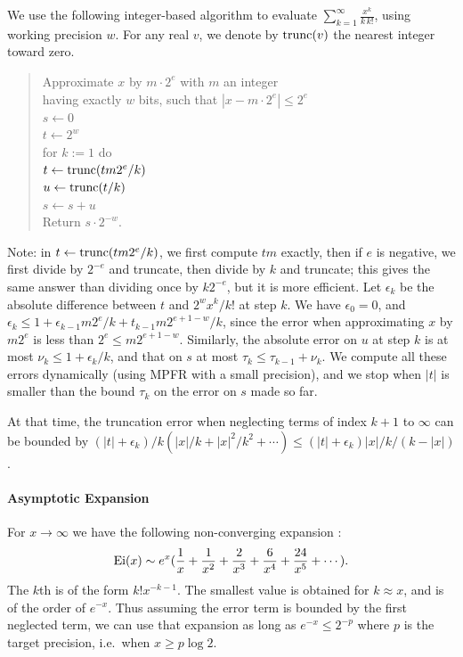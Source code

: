 \documentclass[12pt]{amsart}
\def\q{\hspace*{5mm}}
\begin{document}
We use the following integer-based algorithm to evaluate
$\sum_{k=1}^{\infty} \frac{x^k}{k \, k!}$, using working precision $w$.
For any real $v$, we denote by ${\rm trunc}(v)$ the nearest integer
toward zero.
\begin{quote}
Approximate $x$ by  $m\cdot2^e$ with $m$ an integer \\
having exactly $w$ bits, such that $|x - m\cdot2^e| \leq 2^e$ \\
$s \leftarrow 0$ \\ %
$t \leftarrow 2^w$ \\ %
for $k := 1$ do \\
\q $t \leftarrow {\rm trunc}(t m 2^e/k)$ \\
\q $u \leftarrow {\rm trunc}(t/k)$ \\
\q $s \leftarrow s + u$ \\
Return $s \cdot 2^{-w}$.
\end{quote}
Note: in $t \leftarrow {\rm trunc}(t m 2^e/k)$,
we first compute $tm$ exactly, then if $e$ is negative,
we first divide by $2^{-e}$ and
truncate, then divide by $k$ and truncate; this gives the same answer than
dividing once by $k 2^{-e}$, but it is more efficient.
Let $\epsilon_k$ be the absolute difference between $t$ and
$2^w x^k/k!$ at step $k$.
We have $\epsilon_0=0$, and $\epsilon_k \leq 1 + \epsilon_{k-1} m 2^e/k
+ t_{k-1} m 2^{e+1-w}/k$, since the error when approximating $x$ by
$m 2^e$ is less than $2^e \leq m 2^{e+1-w}$.
Similarly, the absolute error on $u$ at step $k$ is at most
$\nu_k \leq 1 + \epsilon_k/k$,
and that on $s$ at most $\tau_k \leq \tau_{k-1} + \nu_k$.
We compute all these errors dynamically (using MPFR with a small precision),
and we stop when $|t|$ is smaller than the bound $\tau_k$
on the error on $s$ made so far.

At that time, the truncation error when neglecting terms of index $k+1$
to $\infty$ can be bounded by $(|t| + \epsilon_k)/k (|x|/k + |x|^2/k^2 +
\cdots) \leq (|t| + \epsilon_k) |x|/k/(k-|x|)$.

\bigskip

\paragraph{Asymptotic Expansion}

For $x \rightarrow \infty$ we have the following non-converging
expansion \cite[formula 5.1.51]{AbSt73}:
\[ {\rm Ei}(x) \sim e^x (\frac{1}{x} + \frac{1}{x^2} + \frac{2}{x^3}
    + \frac{6}{x^4} + \frac{24}{x^5} + \cdots). \]
The $k$th is of the form $k! x^{-k-1}$. The smallest value is obtained for
$k \approx x$, and is of the order of $e^{-x}$. Thus assuming the error
term is bounded by the first neglected term, we can use that expansion
as long as $e^{-x} \leq 2^{-p}$ where $p$ is the target precision,
i.e.~when $x \geq p \log 2$.
\end{document}
